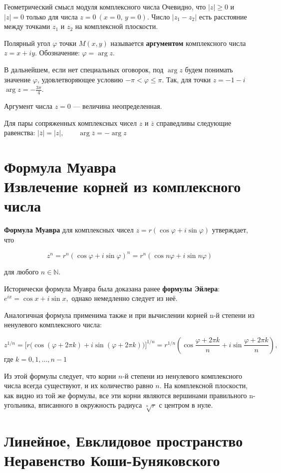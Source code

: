 Геометрический смысл модуля комплексного числа
Очевидно, что $|z|\geqslant0$ и $|z|=0$ только для числа $z=0~(x=0,\,y=0)$.
Число $|z_1-z_2|$ есть расстояние между точками $z_1$ и $z_2$ на комплексной плоскости.

Полярный угол $\varphi$ точки $M(x,y)$ называется \textbf{аргументом} комплексного числа $z=x+iy$. Обозначение: $\varphi=\arg z$.

В дальнейшем, если нет специальных оговорок, под $\arg z$ будем понимать значение $\varphi$, удовлетворяющее условию $-\pi<\varphi\leqslant\pi$. Так, для точки $z=-1-i$ $\arg z=-\frac{3\pi}{4}$.

Аргумент числа $z = 0$ — величина неопределенная.

Для пары сопряженных комплексных чисел $z$ и $\overline{z}$ справедливы следующие равенства: $|\overline{z}|= |z|,\qquad \arg\overline{z}=-\arg z$

\section{Формула Муавра\\ {\normalfont Извлечение корней из комплексного числа}}

\textbf{Формула Муавра} для комплексных чисел $z=r(\cos \varphi +i\sin \varphi)$ утверждает, что

$$z^{n}=r^{n}(\cos \varphi +i\sin \varphi )^{n}=r^{n}(\cos n\varphi +i\sin n\varphi)$$

для любого $n\in \mathbb{N}$.

Исторически формула Муавра была доказана ранее \textbf{формулы Эйлера}:
$e^{ix}=\cos x+i\sin x,$ однако немедленно следует из неё.

Аналогичная формула применима также и при вычислении корней n-й степени из ненулевого комплексного числа:

$$z^{1/n}={\big [}r{\big (}\cos(\varphi +2\pi k)+i\sin(\varphi +2\pi k){\big )}{\big ]}^{1/n}=r^{1/n}\left(\cos {\frac {\varphi +2\pi k}{n}}+i\sin {\frac {\varphi +2\pi k}{n}}\right),$$
где $k=0,1,\dots ,n-1$

Из этой формулы следует, что корни $n$-й степени из ненулевого комплексного числа всегда существуют, и их количество равно $n$. На комплексной плоскости, как видно из той же формулы, все эти корни являются вершинами правильного n-угольника, вписанного в окружность радиуса $\sqrt[ {n}]{r}$ с центром в нуле.

\section{Линейное, Евклидовое пространство\\ {\normalfont Неравенство Коши-Буняковского}}
